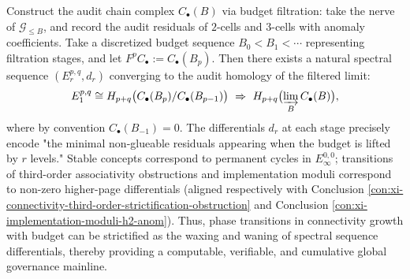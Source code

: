 \begin{conclusion}\label{con:xi-budget-anom-spectral-sequence}
Construct the audit chain complex \(C_\bullet(B)\) via budget filtration: take the nerve of \(\mathcal{G}_{\le B}\), and record the audit residuals of \(2\)-cells and \(3\)-cells with anomaly coefficients.
Take a discretized budget sequence \(B_0<B_1<\cdots\) representing filtration stages, and let \(F^{p}C_\bullet:=C_\bullet(B_p)\).
Then there exists a natural spectral sequence \((E_r^{p,q},d_r)\) converging to the audit homology of the filtered limit:
\[
E_1^{p,q}\cong H_{p+q}\bigl(C_\bullet(B_{p})/C_\bullet(B_{p-1})\bigr)
\ \Rightarrow\
H_{p+q}\bigl(\varinjlim_B C_\bullet(B)\bigr),
\]
where by convention \(C_\bullet(B_{-1})=0\).
The differentials \(d_r\) at each stage precisely encode "the minimal non-glueable residuals appearing when the budget is lifted by \(r\) levels."
Stable concepts correspond to permanent cycles in \(E_\infty^{0,0}\);
transitions of third-order associativity obstructions and implementation moduli correspond to non-zero higher-page differentials (aligned respectively with Conclusion \ref{con:xi-connectivity-third-order-strictification-obstruction} and Conclusion \ref{con:xi-implementation-moduli-h2-anom}).
Thus, phase transitions in connectivity growth with budget can be strictified as the waxing and waning of spectral sequence differentials, thereby providing a computable, verifiable, and cumulative global governance mainline.
\end{conclusion}

